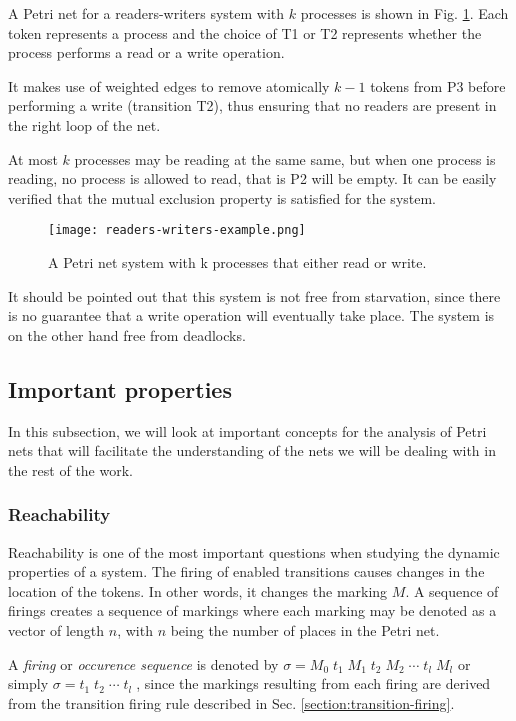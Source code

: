 A Petri net for a readers-writers system with $k$ processes is shown in Fig. \ref{fig:readers-writers-example}.
Each token represents a process and the choice of T1 or T2
represents whether the process performs a read or a write operation.

It makes use of weighted edges to remove atomically
$k - 1$ tokens from P3 before performing a write (transition T2),
thus ensuring that no readers are present in the right loop of the net.

At most $k$ processes may be reading at the same same,
but when one process is reading, no process is allowed to read, that is P2 will be empty.
It can be easily verified that the mutual exclusion property is satisfied for the system.

\begin{figure}[H]
    \centering
    \texttt{[image: readers-writers-example.png]}
    \caption{A Petri net system with k processes that either read or write.}
    \label{fig:readers-writers-example}
\end{figure}

It should be pointed out that this system is not free from starvation,
since there is no guarantee that a write operation will eventually take place.
The system is on the other hand free from deadlocks.

\subsection{Important properties}

In this subsection, we will look at important concepts for the analysis of Petri nets
that will facilitate the understanding of the nets we will be dealing with in the rest of the work.

\subsubsection{Reachability}

Reachability is one of the most important questions when studying the dynamic properties of a system.
The firing of enabled transitions causes changes in the location of the tokens.
In other words, it changes the marking $M$.
A sequence of firings creates a sequence of markings
where each marking may be denoted as a vector of length $n$,
with $n$ being the number of places in the Petri net.

A \textit{firing} or \textit{occurence sequence} is denoted by
$ \sigma = M_0\; t_1\; M_1\; t_2\; M_2\; \cdots\; t_l\; M_l$ or simply
$ \sigma = t_1\; t_2\; \cdots\; t_l\; $, since the markings
resulting from each firing are derived
from the transition firing rule described in Sec. \ref{section:transition-firing}.

